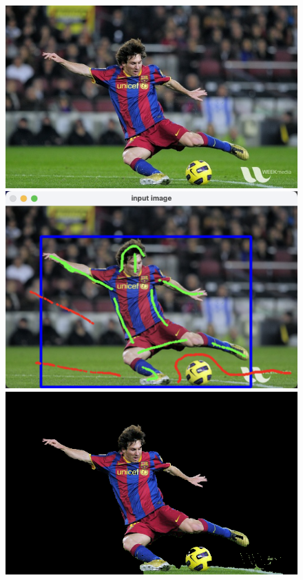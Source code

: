 \documentclass[lang=cn,11pt,a4paper]{elegantpaper}
\begin{document}
\begin{figure}[ht]
	\begin{minipage}{0.3\linewidth}
		\centering
		\includegraphics[width=0.95\linewidth]{image/messi.jpg}
	\end{minipage}
	\begin{minipage}{0.3\linewidth}
		\centering
		\includegraphics[width=0.9\linewidth]{image/messi_graffiti.png}
	\end{minipage}
	\begin{minipage}{0.3\linewidth}
		\centering
		\includegraphics[width=0.9\linewidth]{image/result_messi.png}
	\end{minipage}
\end{figure}
\end{document}

